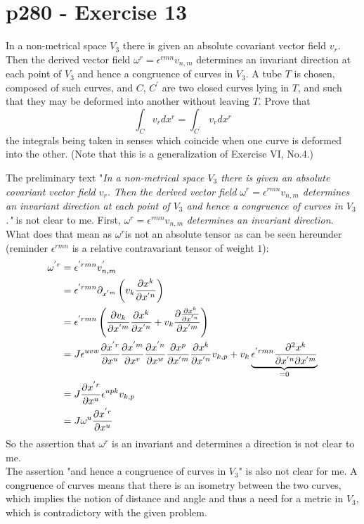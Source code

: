 \section{p280 - Exercise 13}
\begin{tcolorbox}
In a non-metrical space $V_3$ there is given an absolute covariant vector field $v_r$. Then the derived vector field $\omega^r =\epsilon^{rmn}v_{n,m}$ determines an invariant direction at each point of $V_3$ and hence a congruence of curves in $V_3$. A tube $T$ is chosen, composed of such curves, and $C$, $C^{'}$ are two closed curves lying in $T$, and such that they may be deformed into another without leaving $T$. Prove that
$$\int_{C} v_rdx^r = \int_{C^{'}} v_r dx^r$$
the integrals being taken in senses which coincide when one curve is deformed into the other. (Note that this is a generalization of Exercise VI, No.4.) 
\end{tcolorbox}
The preliminary text "\textit{In a non-metrical space $V_3$ there is given an absolute covariant vector field $v_r$. Then the derived vector field $\omega^r =\epsilon^{rmn}v_{n,m}$ determines an invariant direction at each point of $V_3$ and hence a congruence of curves in $V_3$."} is not clear to me.
First, $\omega^r =\epsilon^{rmn}v_{n,m}$ \textit{determines an invariant direction}. What does that mean as  $\omega^r$is not an absolute tensor as can be seen hereunder (reminder $\epsilon^{rmn}$ is a relative contravariant tensor of weight $1$):
\begin{align}
\omega^{'r} &=\epsilon^{'rmn}v^{'}_{n,m}\\
&=\epsilon^{'rmn}\partial_{x^{'m}}\left(v_{k}\pdv{x^k}{x^{'n}}\right)\\
&=\epsilon^{'rmn}\left(\pdv{v_{k}}{x^{'m}}\pdv{x^k}{x^{'n}}+ v_{k}\pdv{\pdv{x^k}{x^{'n}}}{x^{'m}}\right)\\
&=J\epsilon^{uvw}\pdv{x^{'r}}{x^{u}}\pdv{x^{'m}}{x^{v}}\pdv{x^{'n}}{x^{w}}\pdv{x^{p}}{x^{'m}}\pdv{x^k}{x^{'n}}v_{k,p}+ v_{k}\underbrace{\epsilon^{'rmn}\pdv[2]{x^k}{x^{'n}}{x^{'m}}}_{=0}\\
&=J\pdv{x^{'r}}{x^{u}}\epsilon^{upk}v_{k,p}\\
&=J\omega^{u}\pdv{x^{'r}}{x^{u}}
\end{align}
So the assertion that $\omega^r$ is an invariant  and determines a direction is not clear to me.\\ 
The assertion "and hence a congruence of curves in $V_3$" is also not clear for me. A congruence of curves means that there is an isometry between the two curves, which implies the notion of distance and angle and thus a need for a metric in $V_3$, which is contradictory with the given problem.
